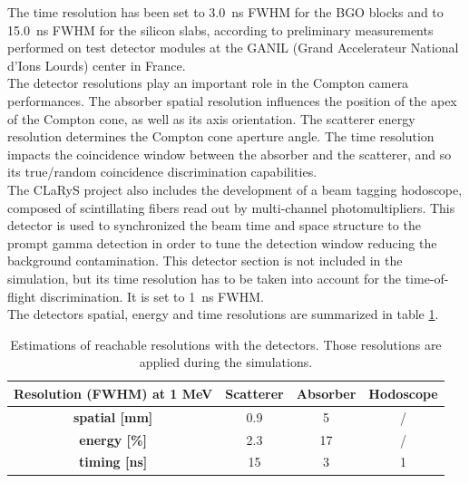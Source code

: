 The time resolution has been set to 3.0~ns FWHM for the BGO blocks and to 15.0~ns FWHM for the silicon slabs, according to preliminary measurements performed on test detector modules at the GANIL (Grand Accelerateur National d'Ions Lourds) center in France.\\
The detector resolutions play an important role in the Compton camera performances. The absorber spatial resolution influences the position of the apex of the Compton cone, as well as its axis orientation. The scatterer energy resolution determines the Compton cone aperture angle. The time resolution impacts the coincidence window between the absorber and the scatterer, and so its true/random coincidence discrimination capabilities.\\
The CLaRyS project also includes the development of a beam tagging hodoscope, composed of scintillating fibers read out by multi-channel photomultipliers. This detector is used to synchronized the beam time and space structure to the prompt gamma detection in order to tune the detection window reducing the background contamination. This detector section is not included in the simulation, but its time resolution has to be taken into account for the time-of-flight discrimination. It is set to 1~ns FWHM.\\ 
The detectors spatial, energy and time resolutions are summarized in table \ref{table:table_resolution_detecteurs_CC_simulation_Hadronth}.

\begin{table} [!htbp]
\centering
\caption{Estimations of reachable resolutions with the detectors. Those resolutions are applied during the simulations.}
\begin{tabular}{cccc}
\hline
\textbf{Resolution (FWHM) at 1 MeV} & \textbf{Scatterer} & \textbf{Absorber} & \textbf{Hodoscope}\\
\hline 
\textbf{spatial [mm]	}			 &     0.9		 &  5 &	 /\\
\textbf{energy [\%]}				&	2.3			&  17	&	/\\
\textbf{timing [ns]}	        		&	15			&	3 	&  1\\
\hline
\end{tabular}
\label{table:table_resolution_detecteurs_CC_simulation_Hadronth}
\end{table}
       

